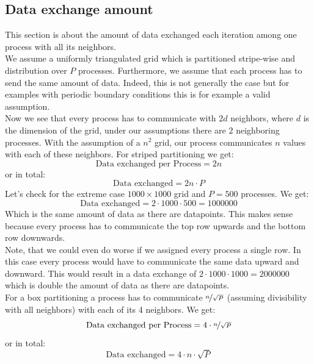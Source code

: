 \subsection{Data exchange amount}
This section is about the amount of data exchanged each iteration among one process with all its neighbors.\\
We assume a uniformly triangulated grid which is partitioned stripe-wise and distribution over $P$ processes. Furthermore, we assume that each process has to send the same amount of data. Indeed, this is not generally the case but for examples with periodic boundary conditions this is for example a valid assumption.\\
Now we see that every process has to communicate with $2d$ neighbors, where $d$ is the dimension of the grid, under our assumptions there are $2$ neighboring processes. With the assumption of a $n^2$ grid, our process communicates $n$ values with each of these neighbors. For striped partitioning we get: 
\begin{equation*}
    \text{Data exchanged per Process} = 2n 
\end{equation*}
or in total: 
\begin{equation*}
    \text{Data exchanged} = 2n \cdot P 
\end{equation*}
Let's check for the extreme case $1000\times1000$ grid and $P=500$ processes. We get:
\begin{equation*}
    \text{Data exchanged} = 2\cdot1000\cdot500 = 1000000
\end{equation*}
Which is the same amount of data as there are datapoints. This makes sense because every process has to communicate the top row upwards and the bottom row downwards.\\
Note, that we could even do worse if we assigned every process a single row. In this case every process would have to communicate the same data upward and downward. This would result in a data exchange of $2\cdot1000\cdot1000 = 2000000$ which is double the amount of data as there are datapoints.\\
For a box partitioning a process has to communicate $\nicefrac{n}{\sqrt{P}}$ (assuming divisibility with all neighbors) with each of its 4 neighbors. We get:
\begin{equation*}
    \text{Data exchanged per Process} = 4 \cdot \nicefrac{n}{\sqrt{P}}
\end{equation*}
or in total: 
\begin{equation*}
    \text{Data exchanged} = 4 \cdot n \cdot \sqrt{P}
\end{equation*}
